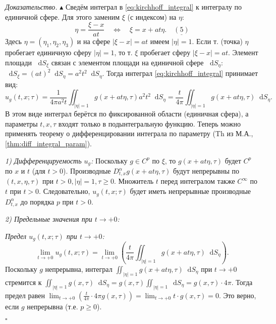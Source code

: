 \documentclass[12pt, a4paper]{article}
\newcommand{\dd}{\mathop{}\!\mathrm{d}} %
\newenvironment{proof}[1][\proofname]{\par\noindent\textit{#1.}\quad}{\hfill$\square$}
\renewcommand{\proofname}{Доказательство}
\begin{document}
\begin{proof}
$\blacktriangle$ Сведём интеграл в \eqref{eq:kirchhoff_integral} к интегралу по единичной сфере. Для этого заменим $\xi$ (с индексом) на $\eta$:
$$ \eta = \frac{\xi-x}{at} \quad \iff \quad \xi = x + at\eta. \quad \underline{(5)} $$
Здесь $\eta = (\eta_1, \eta_2, \eta_3)$ и на сфере $|\xi-x|=at$ имеем $|\eta|=1$.
Если т. (точка) $\eta$ пробегает единичную сферу $|\eta|=1$, то т. $\xi$ пробегает сферу $|\xi-x|=at$.
Элемент площади $\dd S_\xi$ связан с элементом площади на единичной сфере $\dd S_\eta$: $\dd S_\xi = (at)^2 \dd S_\eta = a^2 t^2 \dd S_\eta$.
Тогда интеграл \eqref{eq:kirchhoff_integral} принимает вид:
\begin{equation} \label{eq:kirchhoff_unit_sphere}
u_g(t,x;\tau) = \frac{1}{4\pi a^2 t} \iint_{|\eta|=1} g(x+at\eta, \tau) a^2 t^2 \dd S_\eta = \frac{t}{4\pi} \iint_{|\eta|=1} g(x+at\eta, \tau) \dd S_\eta.
\end{equation}
В этом виде интеграл берётся по фиксированной области (единичная сфера), а параметры $t, x, \tau$ входят только в подынтегральную функцию.
Теперь можно применять теорему о дифференцировании интеграла по параметру (Th из М.А., \ref{thm:diff_integral_param}).

\textit{1) Дифференцируемость $u_g$:}
Поскольку $g \in C^p$ по $\xi$, то $g(x+at\eta, \tau)$ будет $C^p$ по $x$ и $t$ (для $t>0$).
Производные $D_{t,x}^\alpha g(x+at\eta, \tau)$ будут непрерывны по $(t,x,\eta,\tau)$ при $t>0, |\eta|=1, \tau \ge 0$.
Множитель $t$ перед интегралом также $C^\infty$ по $t$ при $t>0$.
Следовательно, $u_g(t,x;\tau)$ будет иметь непрерывные производные $D_{t,x}^\alpha$ до порядка $p$ при $t>0$.

\textit{2) Предельные значения при $t \to +0$:}

\textit{Предел $u_g(t,x;\tau)$ при $t \to +0$:}
$$ \lim_{t \to +0} u_g(t,x;\tau) = \lim_{t \to +0} \left( \frac{t}{4\pi} \iint_{|\eta|=1} g(x+at\eta, \tau) \dd S_\eta \right). $$
Поскольку $g$ непрерывна, интеграл $\iint_{|\eta|=1} g(x+at\eta, \tau) \dd S_\eta$ при $t \to +0$ стремится к $\iint_{|\eta|=1} g(x, \tau) \dd S_\eta = g(x,\tau) \iint_{|\eta|=1} \dd S_\eta = g(x,\tau) \cdot 4\pi$.
Тогда предел равен $\lim_{t \to +0} \left( \frac{t}{4\pi} \cdot 4\pi g(x,\tau) \right) = \lim_{t \to +0} t \cdot g(x,\tau) = 0$.
Это верно, если $g$ непрерывна (т.е. $p \ge 0$).


\end{proof}
\end{document}

